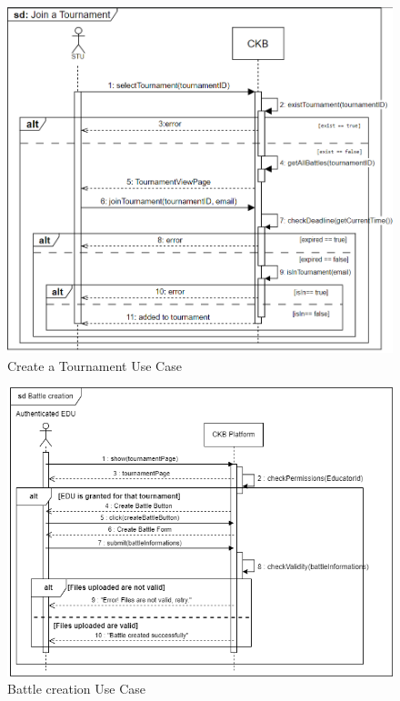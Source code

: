 \begin{figure}[H]
    \centering
    \includegraphics[width=1\textwidth]{images/sequence_diagrams/.png/Create_Tournament - UC3.png}
    \caption{Create a Tournament Use Case}
    \label{fig:uc3}
\end{figure}
\begin{figure}[H]
    \centering
    \includegraphics[width=1\textwidth]{images/sequence_diagrams/ClassDiagram-UC4- SequenceDiagram.png}
    \caption{Battle creation Use Case}
    \label{fig:uc4}
\end{figure}
